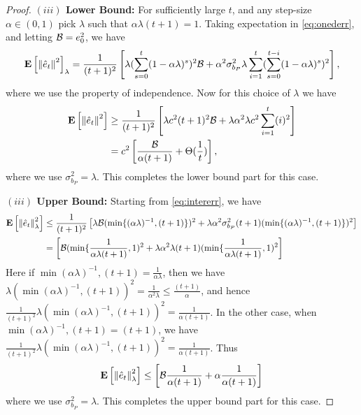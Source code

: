 \begin{proof}
\textbf{$(iii)$ Lower Bound:}
For sufficiently large $t$, and any step-size$\alpha \in (0,1)$ pick $\lambda$ such that $\alpha \lambda (t+1)=1$. Taking expectation in \eqref{eq:onederr}, and letting $\mathcal{B}=e_0^2$, we have
\begin{align}\label{eq:intererr}
\mathbf{E}\left[\left\| \hat{e}_t\right\|^2\right]_{\lambda}=\frac{1}{(t+1)^2}\left[ \lambda (\sum_{s=0}^t(1-\alpha \lambda)^s)^2 \mathcal{B}+ \alpha^2\sigma^2_{b_P}\lambda \sum_{i=1}^t (\sum_{s=0}^{t-i} (1-\alpha \lambda)^s)^2\right],
\end{align}
where we use the property of independence. Now for this choice of $\lambda$ we have
\begin{align}
\mathbf{E}\left[\left\| \hat{e}_t\right\|^2\right]&\geq \frac{1}{(t+1)^2}\left[ \lambda c^2(t+1)^2 \mathcal{B}+ \lambda \alpha^2 \lambda c^2\sum_{i=1}^t (i)^2\right]\\
&= c^2\left[\frac{\mathcal{B}}{\alpha (t+1)}+   \Theta(\frac{1}{t}) \right],
\end{align}
where we use $\sigma^2_{b_P}=\lambda$. This completes the lower bound part for this case.

\textbf{$(iii)$ Upper Bound:}
Starting from \eqref{eq:intererr}, we have
\begin{align}
\mathbf{E}\left[\left\| \hat{e}_t\right\|^2_{\lambda}\right]&\leq \frac{1}{(t+1)^2}\left[\lambda \mathcal{B} (\min\{(\alpha\lambda)^{-1},(t+1)\})^2+ \lambda \alpha^2 \sigma^2_{b_P} (t+1) (\min\{(\alpha\lambda)^{-1},(t+1)\})^2 \right]\\
&= \left[\mathcal{B} (\min\{\frac{1}{\alpha \lambda (t+1)},1)^2+ \lambda \alpha^2 \lambda (t+1) (\min\{\frac{1}{\alpha \lambda (t+1)},1)^2 \right]\\
\end{align}
Here if $\min{(\alpha\lambda)^{-1},(t+1)}=\frac{1}{\alpha \lambda}$, then we have $\lambda(\min{(\alpha\lambda)^{-1},(t+1)})^2=\frac{1}{\alpha^2 \lambda}\leq \frac{(t+1)}{\alpha}$, and hence $\frac{1}{(t+1)^2}\lambda(\min{(\alpha\lambda)^{-1},(t+1)})^2=\frac{1}{\alpha (t+1)}$. In the other case, when $\min{(\alpha\lambda)^{-1},(t+1)}=(t+1)$, we have
$\frac{1}{(t+1)^2}\lambda(\min{(\alpha\lambda)^{-1},(t+1)})^2=\frac{1}{\alpha (t+1)}$. Thus
\begin{align}
\mathbf{E}\left[\left\| \hat{e}_t\right\|^2_{\lambda}\right]&\leq \left[\mathcal{B} \frac{1}{\alpha (t+1)}+ \alpha \frac{1}{\alpha (t+1)} \right]\\
\end{align}
where we use $\sigma^2_{b_P}=\lambda$. This completes the upper bound part for this case.
\end{proof}
